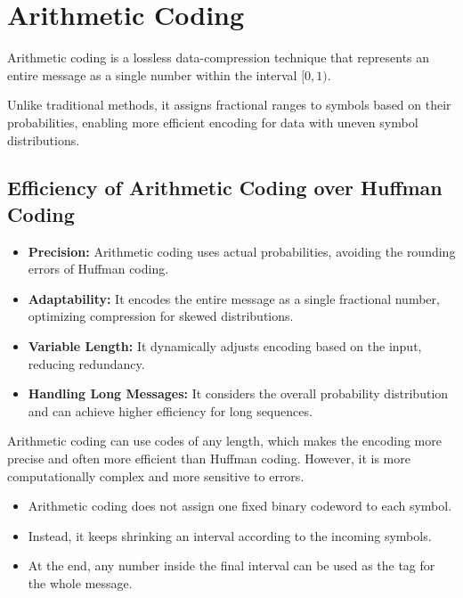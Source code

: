 \documentclass[11pt,a4paper]{book}
\newenvironment{definitionbox}[1][Definition]{%
    \begin{tcolorbox}[
        enhanced,
        breakable,
        colback=primaryblue!10,
        colframe=primaryblue!150,
        title=#1,
        fonttitle=\bfseries,
        sharp corners,
        boxrule=0.8pt,
        left=8pt,
        right=8pt,
        top=6pt,
        bottom=6pt
    ]
}{\end{tcolorbox}}
\newenvironment{infobox}[1][Information]{%
    \begin{tcolorbox}[
        enhanced,
        breakable,
        colback=mintgreen!10,
        colframe=mintgreen!200,
        title=#1,
        fonttitle=\bfseries,
        sharp corners,
        boxrule=0.8pt,
        left=8pt,
        right=8pt,
        top=6pt,
        bottom=6pt
    ]
}{\end{tcolorbox}}
\begin{document}
\clearpage
\section{Arithmetic Coding}

\begin{definitionbox}[Arithmetic Coding]
Arithmetic coding is a lossless data-compression technique that represents an entire message as a single number within the interval \([0,1)\).
\end{definitionbox}

Unlike traditional methods, it assigns fractional ranges to symbols based on their probabilities, enabling more efficient encoding for data with uneven symbol distributions.

\subsection{Efficiency of Arithmetic Coding over Huffman Coding}
\begin{itemize}
    \item \textbf{Precision:} Arithmetic coding uses actual probabilities, avoiding the rounding errors of Huffman coding.
    \item \textbf{Adaptability:} It encodes the entire message as a single fractional number, optimizing compression for skewed distributions.
    \item \textbf{Variable Length:} It dynamically adjusts encoding based on the input, reducing redundancy.
    \item \textbf{Handling Long Messages:} It considers the overall probability distribution and can achieve higher efficiency for long sequences.
\end{itemize}

Arithmetic coding can use codes of any length, which makes the encoding more precise and often more efficient than Huffman coding. However, it is more computationally complex and more sensitive to errors.

\begin{infobox}[First-Timer Idea]
\begin{itemize}
    \item Arithmetic coding does not assign one fixed binary codeword to each symbol.
    \item Instead, it keeps shrinking an interval according to the incoming symbols.
    \item At the end, any number inside the final interval can be used as the tag for the whole message.
\end{itemize}
\end{infobox}
\end{document}
